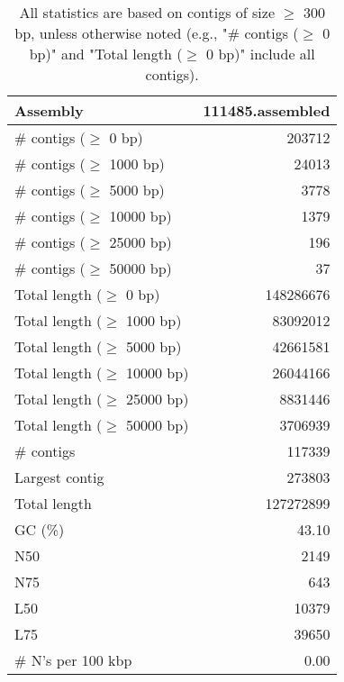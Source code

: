 \documentclass[12pt,a4paper]{article}
\begin{document}
\begin{table}[ht]
\begin{center}
\caption{All statistics are based on contigs of size $\geq$ 300 bp, unless otherwise noted (e.g., "\# contigs ($\geq$ 0 bp)" and "Total length ($\geq$ 0 bp)" include all contigs).}
\begin{tabular}{|l*{1}{|r}|}
\hline
Assembly & 111485.assembled \\ \hline
\# contigs ($\geq$ 0 bp) & 203712 \\ \hline
\# contigs ($\geq$ 1000 bp) & 24013 \\ \hline
\# contigs ($\geq$ 5000 bp) & 3778 \\ \hline
\# contigs ($\geq$ 10000 bp) & 1379 \\ \hline
\# contigs ($\geq$ 25000 bp) & 196 \\ \hline
\# contigs ($\geq$ 50000 bp) & 37 \\ \hline
Total length ($\geq$ 0 bp) & 148286676 \\ \hline
Total length ($\geq$ 1000 bp) & 83092012 \\ \hline
Total length ($\geq$ 5000 bp) & 42661581 \\ \hline
Total length ($\geq$ 10000 bp) & 26044166 \\ \hline
Total length ($\geq$ 25000 bp) & 8831446 \\ \hline
Total length ($\geq$ 50000 bp) & 3706939 \\ \hline
\# contigs & 117339 \\ \hline
Largest contig & 273803 \\ \hline
Total length & 127272899 \\ \hline
GC (\%) & 43.10 \\ \hline
N50 & 2149 \\ \hline
N75 & 643 \\ \hline
L50 & 10379 \\ \hline
L75 & 39650 \\ \hline
\# N's per 100 kbp & 0.00 \\ \hline
\end{tabular}
\end{center}
\end{table}
\end{document}
